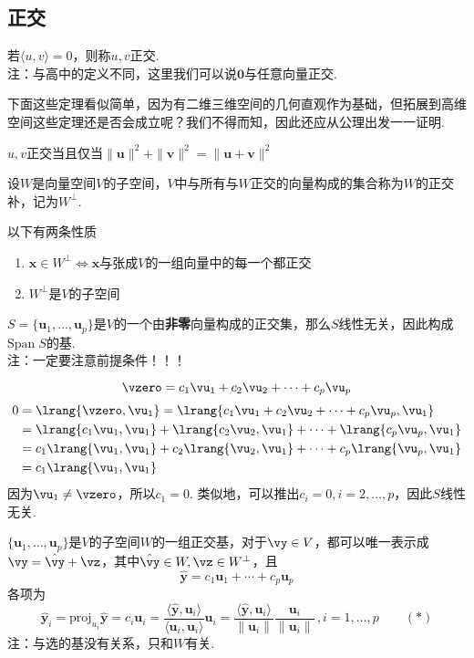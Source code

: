 \subsection{正交}
\begin{definition}[正交]
若$\langle u,v\rangle=0$，则称$u,v$正交.\\
注：与高中的定义不同，这里我们可以说$\mathbf{0}$与任意向量正交.
\end{definition}
下面这些定理看似简单，因为有二维三维空间的几何直观作为基础，但拓展到高维空间这些定理还是否会成立呢？我们不得而知，因此还应从公理出发一一证明.
\begin{theorem}
$u,v$正交当且仅当$\|\mathbf{u}\|^2+\|\mathbf{v}\|^2=\|\mathbf{u}+\mathbf{v}\|^2$
\end{theorem}
\begin{definition}
设$W$是向量空间$V$的子空间，$V$中与所有与$W$正交的向量构成的集合称为$W$的正交补，记为$W^\perp$.
\end{definition}
以下有两条性质
\begin{enumerate}
	\itemsep -3pt
	\item $\mathbf{x}\in W^\perp\iff\mathbf{x}$与张成$V$的一组向量中的每一个都正交
	\item $W^\perp$是$V$的子空间
\end{enumerate}
\begin{theorem}[正交必定线性无关]
\label{ortho_indep}
$S=\{\mathbf{u}_1,\dots,\mathbf{u}_p\}$是$V$的一个由\textbf{非零}向量构成的正交集，那么$S$线性无关，因此构成$\mathrm{Span}\;S$的基.\\
注：一定要注意前提条件！！！
\end{theorem}
\begin{analysis}
\[\vzero=c_1\vu_1+c_2\vu_2+\cdots+c_p\vu_p\]
\[\begin{aligned}0&=\lrang{\vzero,\vu_1}=\lrang{c_1\vu_1+c_2\vu_2+\cdots+c_p\vu_p,\vu_1}\\
&=\lrang{c_1\vu_1,\vu_1}+\lrang{c_2\vu_2,\vu_1}+\cdots+\lrang{c_p\vu_p,\vu_1}\\
&=c_1\lrang{\vu_1,\vu_1}+c_2\lrang{\vu_2,\vu_1}+\cdots+c_p\lrang{\vu_p,\vu_1}\\
&=c_1\lrang{\vu_1,\vu_1}
\end{aligned}\]
因为$\vu_1\ne\vzero$，所以$c_1=0$. 类似地，可以推出$c_i=0,i=2,\dots,p$，因此$S$线性无关.
\end{analysis}
\begin{theorem}[正交分解]
$\{\mathbf{u}_1,\dots,\mathbf{u}_p\}$是$V$的子空间$W$的一组正交基，对于$\vy\in V$，都可以唯一表示成$\vy=\hat{\vy}+\vz$，其中$\hat{\vy}\in W,\vz\in W^\perp$，且
\[\hat{\mathbf{y}}=c_1\mathbf{u}_1+\cdots+c_p\mathbf{u}_p\]
各项为
\[\hat{\mathbf{y}}_i=\mathrm{proj}_{u_i}\hat{\mathbf{y}}=c_i\mathbf{u}_i=\frac{\langle \hat{\mathbf{y}},\mathbf{u}_i\rangle}{\langle\mathbf{u}_i,\mathbf{u}_i\rangle}\mathbf{u}_i=\frac{\langle \hat{\mathbf{y}},\mathbf{u}_i\rangle}{\|\mathbf{u}_i\|}\frac{\mathbf{u}_i}{\|\mathbf{u}_i\|}\,,i=1,\dots,p\qquad(*)\]
注：与选的基没有关系，只和$W$有关.
\end{theorem}
